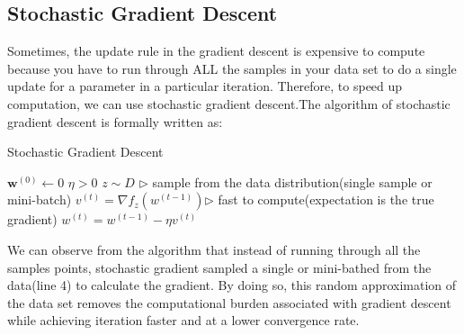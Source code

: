 \documentclass[11pt]{article}
\begin{document}
\subsection{Stochastic Gradient Descent}
Sometimes, the update rule in the gradient descent is expensive to compute because you have to run through ALL the samples in your data set to do a single update for a parameter in a particular iteration. Therefore, to speed up computation, we can use stochastic gradient descent.The algorithm of stochastic gradient descent is formally written as:  
\begin{algorithm}[H]
\caption{Stochastic Gradient Descent}
\label{algo:sgd}
\begin{algorithmic}[1]
\STATE $\textbf{w}^{(0)} \leftarrow 0$ 
\STATE $\eta > 0$ 
\STATE $z \sim D$ \hfill $\triangleright$ sample from the data distribution(single sample or mini-batch)
\STATE $v^{(t)}= \nabla{f_z(w^{(t-1)})}$\hfill $\triangleright$ fast to compute(expectation is the true gradient)
\STATE $w^{(t)}= w^{(t-1)}-\eta v^{(t)}$ 
\ENDFOR
\end{algorithmic}
\end{algorithm}
We can observe from the algorithm that instead of running through all the samples points, stochastic gradient sampled a single or mini-bathed from the data(line 4) to calculate the gradient. By doing so, this random approximation of the data set removes the computational burden associated with gradient descent while achieving iteration faster and at a lower convergence rate.
\end{document}
